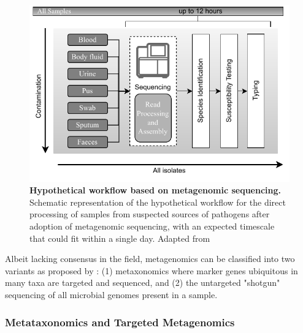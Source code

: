 \begin{figure}[h!]
\centering
\includegraphics[width=\textwidth]{figures/introduction/Figure 4.pdf}
\caption{\textbf{Hypothetical workflow based on metagenomic sequencing.} Schematic representation of the hypothetical workflow for the direct processing of samples from suspected sources of pathogens after adoption of metagenomic sequencing, with an expected timescale that could fit within a single day. Adapted from \cite{didelot_transforming_2012}}
\label{fig:figure4}
\end{figure}


Albeit lacking consensus in the field, metagenomics can be classified into two variants as proposed by \citep{marchesi_vocabulary_2015}: (1) metaxonomics where marker genes ubiquitous in many taxa are targeted and sequenced, and (2) the untargeted "shotgun" sequencing of all microbial genomes present in a sample. 

\subsubsection{Metataxonomics and Targeted Metagenomics} \label{sssec:_intro_metataxonomics}

